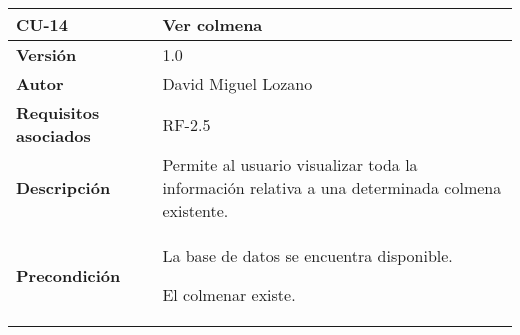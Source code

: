 \begin{longtable}[H]{@{}ll@{}}
\toprule
\begin{minipage}[b]{0.21\columnwidth}\raggedright\strut
\textbf{CU-14}\strut
\end{minipage} & \begin{minipage}[b]{0.73\columnwidth}\raggedright\strut
\textbf{Ver colmena}\strut
\end{minipage}\tabularnewline
\midrule
\endhead
\begin{minipage}[t]{0.21\columnwidth}\raggedright\strut
\textbf{Versión}\strut
\end{minipage} & \begin{minipage}[t]{0.73\columnwidth}\raggedright\strut
1.0\strut
\end{minipage}\tabularnewline
\begin{minipage}[t]{0.21\columnwidth}\raggedright\strut
\textbf{Autor}\strut
\end{minipage} & \begin{minipage}[t]{0.73\columnwidth}\raggedright\strut
David Miguel Lozano\strut
\end{minipage}\tabularnewline
\begin{minipage}[t]{0.21\columnwidth}\raggedright\strut
\textbf{Requisitos asociados}\strut
\end{minipage} & \begin{minipage}[t]{0.73\columnwidth}\raggedright\strut
RF-2.5\strut
\end{minipage}\tabularnewline
\begin{minipage}[t]{0.21\columnwidth}\raggedright\strut
\textbf{Descripción}\strut
\end{minipage} & \begin{minipage}[t]{0.73\columnwidth}\raggedright\strut
Permite al usuario visualizar toda la información relativa a una
determinada colmena existente.\strut
\end{minipage}\tabularnewline
\begin{minipage}[t]{0.21\columnwidth}\raggedright\strut
\textbf{Precondición}\strut
\end{minipage} & \begin{minipage}[t]{0.73\columnwidth}\raggedright\strut
La base de datos se encuentra disponible.

El colmenar existe.


\end{minipage}
\end{longtable}
